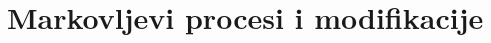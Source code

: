 \documentclass[main.tex]{subfiles}
\begin{document}
\nocite{*}

\section{Markovljevi procesi i modifikacije} \label{sec:sp-markov}
\end{document}

